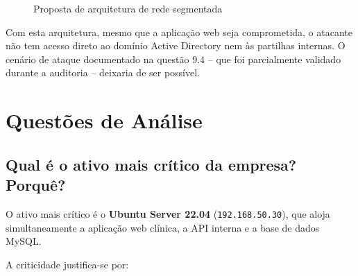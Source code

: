 \documentclass[12pt, a4paper]{report}
\begin{document}
\begin{figure}[H]
\caption{Proposta de arquitetura de rede segmentada}
\label{fig:arquitetura_melhorada}
\end{figure}

\begin{notebox}
Com esta arquitetura, mesmo que a aplicação web seja comprometida, o atacante não tem acesso
direto ao domínio Active Directory nem às partilhas internas. O cenário de ataque documentado
na questão 9.4 -- que foi parcialmente validado durante a auditoria -- deixaria de ser possível.
\end{notebox}

\chapter{Questões de Análise}

\section{Qual é o ativo mais crítico da empresa? Porquê?}

O ativo mais crítico é o \textbf{Ubuntu Server 22.04} (\texttt{192.168.50.30}), que aloja
simultaneamente a aplicação web clínica, a API interna e a base de dados MySQL.

A criticidade justifica-se por:
\end{document}

